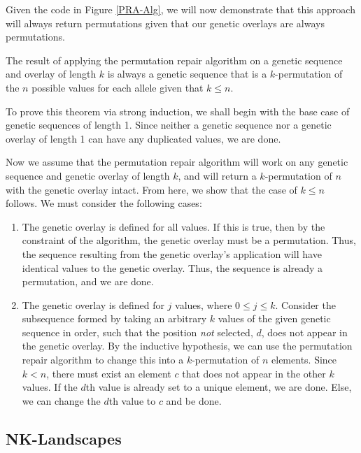 Given the code in Figure \ref{PRA-Alg}, we will now demonstrate that this approach will always return permutations given that our genetic overlays are always permutations.

\begin{thm}
The result of applying the permutation repair algorithm on a genetic sequence and overlay of length $k$ is always a genetic sequence that is a $k$-permutation of the $n$ possible values for each allele given that $ k \leq n$.
\end{thm}

To prove this theorem via strong induction, we shall begin with the base case of genetic sequences of length 1. Since neither a genetic sequence nor a genetic overlay of length 1 can have any duplicated values, we are done. 

Now we assume that the permutation repair algorithm will work on any genetic sequence and genetic overlay of length $k$, and will return a $k$-permutation of $n$ with the genetic overlay intact. From here, we show that the case of $k \leq n$ follows. We must consider the following cases:
\begin{enumerate}
\item The genetic overlay is defined for all values. 
If this is true, then by the constraint of the algorithm, the genetic overlay must be a permutation. Thus, the sequence resulting from the genetic overlay's application will have identical values to the genetic overlay. Thus, the sequence is already a permutation, and we are done.

\item The genetic overlay is defined for $j$ values, where $0 \leq j \leq k $. 
Consider the subsequence formed by taking an arbitrary $k$ values of the given genetic sequence in order, such that the position \emph{not} selected, $d$, does not appear in the genetic overlay. By the inductive hypothesis, we can use the permutation repair algorithm to change this into a $k$-permutation of $n$ elements. Since $k < n$, there must exist an element $c$ that does not appear in the other $k$ values. If the $d$th value is already set to a unique element, we are done. Else, we can change the $d$th value to $c$ and be done.
\end{enumerate}

%
%

\subsection*{NK-Landscapes}

